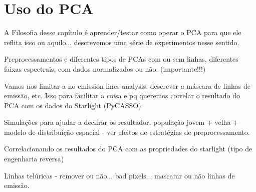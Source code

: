 



\chapter{Uso do PCA}
\label{sec:UsoPCA}
\ojo
A Filosofia desse capítulo é aprender/testar como operar o PCA para que ele 
reflita isso ou aquilo... descrevemos uma série de experimentos nesse sentido.

Preprocessamentos e diferentes tipos de PCAs com ou sem linhas, diferentes 
faixas espectrais, com dados normalizados ou não. (importante!!!)

Vamos nos limitar a no-emission lines analysis, descrever a máscara de linhas 
de emissão, etc. Isso para facilitar a coisa e pq queremos correlar o 
resultado do PCA com os dados do Starlight (PyCASSO).

Simulações para ajudar a decifrar os resultador, população jovem + velha + 
modelo de distribuição espacial - ver efeitos de estratégias de 
preprocessamento.

Correlacionando os resultados do PCA com as propriedades do starlight (tipo de 
engenharia reversa)

Linhas telúricas - remover ou não... bad pixels... mascarar ou não linhas de 
emissão.
